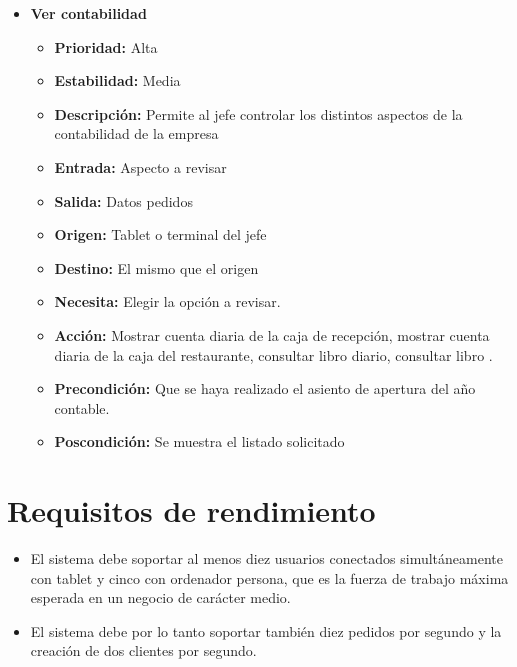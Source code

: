 \documentclass[spanish,a4paper,11pt, twoside]{report}	%
\begin{document}
\begin{itemize}
\begin{itemize}
		\end{itemize}%

		\item \textbf{Ver contabilidad} %

		\begin{itemize}

			\item \textbf{Prioridad: }Alta
			\item \textbf{Estabilidad: }Media
			\item \textbf{Descripción: }Permite al jefe controlar los distintos aspectos de la contabilidad de la empresa
			\item \textbf{Entrada: } Aspecto a revisar
			\item \textbf{Salida: } Datos pedidos
			\item \textbf{Origen: } Tablet o terminal del jefe
			\item \textbf{Destino: } El mismo que el origen
			\item \textbf{Necesita: } Elegir la opción a revisar.
			\item \textbf{Acción: }Mostrar cuenta diaria de la caja de recepción, mostrar cuenta diaria de la caja del restaurante, consultar libro diario, consultar libro .
			\item \textbf{Precondición: } Que se haya realizado el asiento de apertura del año contable.
			\item \textbf{Poscondición: } Se muestra el listado solicitado

		\end{itemize}%

\end{itemize}%

\section{Requisitos de rendimiento}
\begin{itemize}
	\item El sistema debe soportar al menos diez usuarios conectados simultáneamente con tablet y cinco con ordenador persona, que es la fuerza de trabajo máxima esperada en un negocio de carácter medio.
	\item El sistema debe por lo tanto soportar también diez pedidos por segundo y la creación de dos clientes por segundo. 
\end{itemize}
\end{document}
